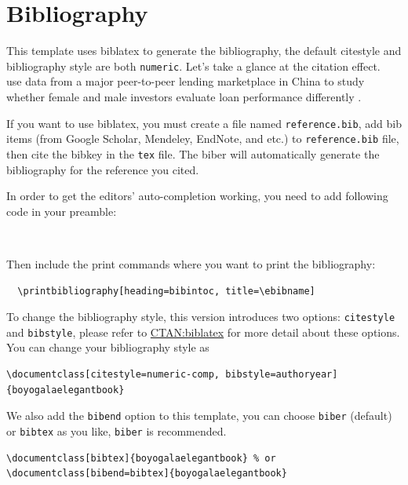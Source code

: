 \documentclass[11pt]{boyogalaelegantbook}
\begin{document}
\section{Bibliography}

This template uses biblatex to generate the bibliography, the default citestyle and bibliography style are both \lstinline{numeric}. Let's take a glance at the citation effect. ~\cite{en1} use data from a major peer-to-peer lending \cite{en3} marketplace in China to study whether female and male investors evaluate loan performance differently \parencite{en2}. 

If you want to use biblatex, you must create a file named \lstinline{reference.bib}, add bib items (from Google Scholar, Mendeley, EndNote, and etc.) to \lstinline{reference.bib} file, then cite the bibkey in the \lstinline{tex} file. The biber will automatically generate the bibliography for the reference you cited.

In order to get the editors' auto-completion working, you need to add following code in your preamble:

\begin{lstlisting}
  
\end{lstlisting}

Then include the print commands where you want to print the bibliography:
\begin{lstlisting}
  \printbibliography[heading=bibintoc, title=\ebibname]
\end{lstlisting}




To change the bibliography style, this version introduces two options: \lstinline{citestyle} and \lstinline{bibstyle}, please refer to \href{https://ctan.org/pkg/biblatex}{CTAN:biblatex} for more detail about these options. You can change your bibliography style as

\begin{lstlisting}
\documentclass[citestyle=numeric-comp, bibstyle=authoryear]{boyogalaelegantbook} 
\end{lstlisting}

We also add the \lstinline{bibend} option to this template, you can choose \lstinline{biber} (default) or \lstinline{bibtex} as you like, \lstinline{biber} is recommended.

\begin{lstlisting}
\documentclass[bibtex]{boyogalaelegantbook} % or
\documentclass[bibend=bibtex]{boyogalaelegantbook}
\end{lstlisting}
\end{document}
